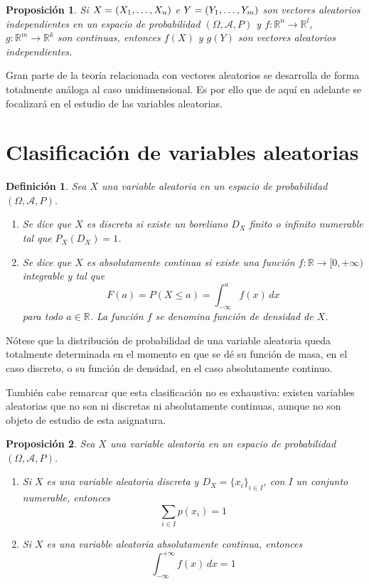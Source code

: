 \documentclass[11pt]{report}
\newtheorem{proposition}{Proposición}
\newtheorem{definition}{Definición}
\theoremstyle{definition}
\newcommand{\R}{\mathbb R}
\begin{document}
\begin{proposition}
Si $X = (X_1,\mathellipsis,X_n)$ e $Y = (Y_1,\mathellipsis,Y_m)$ son vectores aleatorios independientes en un espacio de probabilidad $(\Omega,\mathcal{A},P)$ y $f \colon \R^n \to \R^l$, $g \colon \R^m \to \R^k$ son continuas, entonces $f(X)$ y $g(Y)$ son vectores aleatorios independientes.
\end{proposition}

Gran parte de la teoría relacionada con vectores aleatorios se desarrolla de forma totalmente análoga al caso unidimensional. Es por ello que de aquí en adelante se focalizará en el estudio de las variables aleatorias.

\section{Clasificación de variables aleatorias}

\begin{definition}
Sea $X$ una variable aleatoria en un espacio de probabilidad $(\Omega,\mathcal{A},P)$.
\begin{enumerate}
    \item Se dice que $X$ es \emph{discreta} si existe un boreliano $D_X$ finito o infinito numerable tal que $P_X(D_X)=1$.
    \item Se dice que $X$ es \emph{absolutamente continua} si existe una función $f \colon \R \to [0,+\infty)$ integrable y tal que
    \[F(a)= P (X \leq a)=\int_{-\infty}^a f(x) \, dx\]
    para todo $a \in \R$. La función $f$ se denomina \emph{función de densidad de $X$}.
\end{enumerate}
\end{definition}

Nótese que la distribución de probabilidad de una variable aleatoria queda totalmente determinada en el momento en que se dé su función de masa, en el caso discreto, o su función de densidad, en el caso absolutamente continuo.

También cabe remarcar que esta clasificación no es exhaustiva: existen variables aleatorias que no son ni discretas ni absolutamente continuas, aunque no son objeto de estudio de esta asignatura.

\begin{proposition}
Sea $X$ una variable aleatoria en un espacio de probabilidad $(\Omega,\mathcal{A},P)$.
\begin{enumerate}
    \item Si $X$ es una variable aleatoria discreta y $D_X=\{x_i\}_{i \in I}$, con $I$ un conjunto numerable, entonces
    \[\sum_{i\in I}p(x_i)=1\]
    \item Si $X$ es una variable aleatoria absolutamente continua, entonces
    \[\int_{-\infty}^{+\infty}f(x)\, dx=1\]
\end{enumerate}
\end{proposition}
\end{document}
